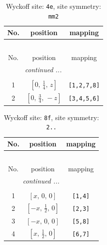 \documentclass[fleqn,8pt]{jsarticle}
\begin{document}
\begin{longtable}{ccc}
\caption{Wyckoff site: {\tt 4e}, site symmetry: {\tt mm2}}
 \\
 \hline \hline
No. & position & mapping \\ \hline \endfirsthead

\multicolumn{2}{l}{\tablename\ \thetable{}} \\
 \hline \hline
No. & position & mapping \\ \hline \endhead

 \hline \hline
\multicolumn{2}{r}{\footnotesize\it continued ...} \\ \endfoot

 \hline \hline
\multicolumn{2}{r}{} \\ \endlastfoot

1 & $\left[ 0,\, \frac{1}{4},\, z \right]$ & {\tt [1,2,7,8]} \\ \hline
2 & $\left[ 0,\, \frac{3}{4},\, - z \right]$ & {\tt [3,4,5,6]} \\
\end{longtable}
\renewcommand{\arraystretch}{1.2}
\begin{longtable}{ccc}
\caption{Wyckoff site: {\tt 8f}, site symmetry: {\tt 2..}}
 \\
 \hline \hline
No. & position & mapping \\ \hline \endfirsthead

\multicolumn{2}{l}{\tablename\ \thetable{}} \\
 \hline \hline
No. & position & mapping \\ \hline \endhead

 \hline \hline
\multicolumn{2}{r}{\footnotesize\it continued ...} \\ \endfoot

 \hline \hline
\multicolumn{2}{r}{} \\ \endlastfoot

1 & $\left[ x,\, 0,\, 0 \right]$ & {\tt [1,4]} \\ \hline
2 & $\left[ - x,\, \frac{1}{2},\, 0 \right]$ & {\tt [2,3]} \\ \hline
3 & $\left[ - x,\, 0,\, 0 \right]$ & {\tt [5,8]} \\ \hline
4 & $\left[ x,\, \frac{1}{2},\, 0 \right]$ & {\tt [6,7]} \\
\end{longtable}
\renewcommand{\arraystretch}{1.2}
\end{document}
